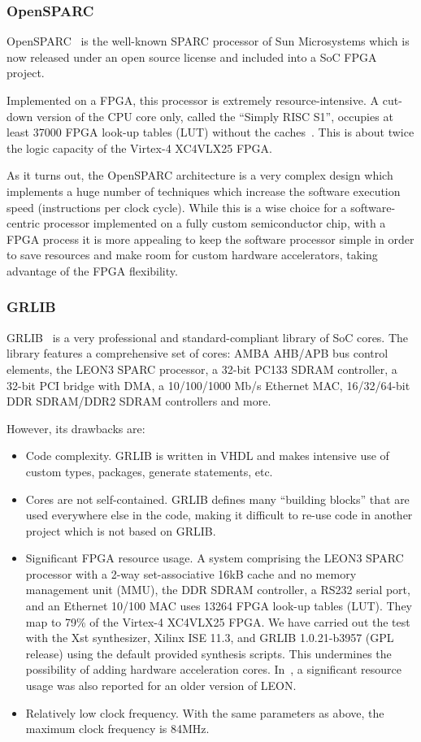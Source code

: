 \documentclass[a4paper,11pt]{kthesis}
\begin{document}
\subsubsection{OpenSPARC}
OpenSPARC~\cite{opensparc} is the well-known SPARC processor of Sun Microsystems which is now released under an open source license and included into a SoC FPGA project.

Implemented on a FPGA, this processor is extremely resource-intensive. A cut-down version of the CPU core only, called the ``Simply RISC S1'', occupies at least 37000 FPGA look-up tables (LUT) without the caches~\cite{simplyrisc}. This is about twice the logic capacity of the Virtex-4 XC4VLX25 FPGA.

As it turns out, the OpenSPARC architecture is a very complex design which implements a huge number of techniques which increase the software execution speed (instructions per clock cycle). While this is a wise choice for a software-centric processor implemented on a fully custom semiconductor chip, with a FPGA process it is more appealing to keep the software processor simple in order to save resources and make room for custom hardware accelerators, taking advantage of the FPGA flexibility.

\subsubsection{GRLIB}
GRLIB~\cite{grlib} is a very professional and standard-compliant library of SoC cores. The library features a comprehensive set of cores: AMBA AHB/APB bus control elements, the LEON3 SPARC processor, a 32-bit PC133 SDRAM controller, a 32-bit PCI bridge with DMA, a 10/100/1000 Mb/s Ethernet MAC, 16/32/64-bit DDR SDRAM/DDR2 SDRAM controllers and more.

However, its drawbacks are:
\begin{itemize}
\item Code complexity. GRLIB is written in VHDL and makes intensive use of custom types, packages, generate statements, etc.
\item Cores are not self-contained. GRLIB defines many ``building blocks'' that are used everywhere else in the code, making it difficult to re-use code in another project which is not based on GRLIB.
\item Significant FPGA resource usage. A system comprising the LEON3 SPARC processor with a 2-way set-associative 16kB cache and no memory management unit (MMU), the DDR SDRAM controller, a RS232 serial port, and an Ethernet 10/100 MAC uses 13264 FPGA look-up tables (LUT). They map to 79\% of the Virtex-4 XC4VLX25 FPGA. We have carried out the test with the Xst synthesizer, Xilinx ISE 11.3, and GRLIB 1.0.21-b3957 (GPL release) using the default provided synthesis scripts. This undermines the possibility of adding hardware acceleration cores. In~\cite{softcorecomp}, a significant resource usage was also reported for an older version of LEON.
\item Relatively low clock frequency. With the same parameters as above, the maximum clock frequency is 84MHz.
\end{itemize}
\end{document}
